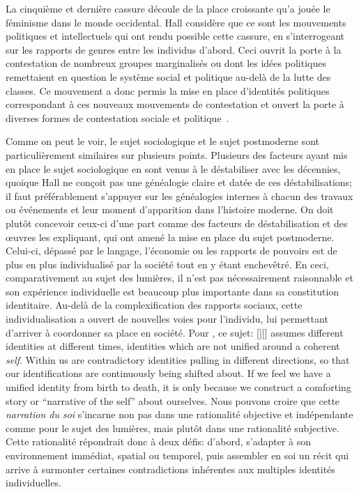 La cinquième et dernière cassure découle de la place croissante qu'a jouée le féminisme dans le monde occidental.
Hall considère que ce sont les mouvements politiques et intellectuels qui ont rendu possible cette cassure, en s'interrogeant sur les rapports de genres entre les individus d'abord.
Ceci ouvrit la porte à la contestation de nombreux groupes marginalisés ou dont les idées politiques remettaient en question le système social et politique au-delà de la lutte des classes.
Ce mouvement a donc permis la mise en place d'identités politiques correspondant à ces nouveaux mouvements de contestation et ouvert la porte à diverses formes de contestation sociale et politique~\citeyearpar[610]{Hall1996a}.

Comme on peut le voir, le sujet sociologique et le sujet postmoderne sont particulièrement similaires sur plusieurs points.
Plusieurs des facteurs ayant mis en place le sujet sociologique en sont venus à le déstabiliser avec les décennies, quoique Hall ne conçoit pas une généalogie claire et datée de ces déstabilisations; il faut préférablement s'appuyer sur les généalogies internes à chacun des travaux ou événements et leur moment d'apparition dans l'histoire moderne.
On doit plutôt concevoir ceux-ci d'une part comme des facteurs de déstabilisation et des œuvres les expliquant, qui ont amené la mise en place du sujet postmoderne.
Celui-ci, dépassé par le langage, l'économie ou les rapports de pouvoirs est de plus en plus individualisé par la société tout en y étant enchevêtré.
En ceci, comparativement au sujet des lumières, il n'est pas nécessairement raisonnable et son expérience individuelle est beaucoup plus importante dans sa constitution identitaire.
Au-delà de la complexification des rapports sociaux, cette individualisation a ouvert de nouvelles voies pour l'individu, lui permettant d'arriver à coordonner sa place en société.
Pour \citeauthor{Hall1996a}, ce sujet: [{\citeyear[598]{Hall1996a}}][]{\textelp{} assumes different identities at different times, identities which are not unified around a coherent \emph{self}. Within us are contradictory identities pulling in different directions, so that our identifications are continuously being shifted about. If we feel we have a unified identity from birth to death, it is only because we construct a comforting story or ``narrative of the self'' about ourselves}.
Nous pouvons croire que cette \emph{narration du soi} s'incarne non pas dans une rationalité objective et indépendante comme pour le sujet des lumières, mais plutôt dans une rationalité subjective.
Cette rationalité répondrait donc à deux défis: d'abord, s'adapter à son environnement immédiat, spatial ou temporel, puis assembler en soi un récit qui arrive à surmonter certaines contradictions inhérentes aux multiples identités individuelles.

